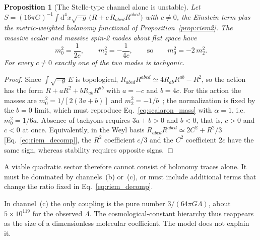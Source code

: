 \documentclass[reprint,aps,prd,amsmath,amssymb,superscriptaddress,nofootinbib,floatfix]{revtex4-2}
\theoremstyle{plain}
\newtheorem{proposition}{Proposition}
\theoremstyle{definition}
\theoremstyle{remark}
\newcommand{\dd}{\mathrm{d}}
\begin{document}
\begin{proposition}[The Stelle-type channel alone is unstable]
\label{prop:stelle}
Let $S=(16\pi G)^{-1}\int\dd^4x\sqrt{-g}\,\big(R+c\,R_{abcd}R^{abcd}\big)$ with $c\neq0$, the Einstein term plus the
metric-weighted holonomy functional of Proposition~\ref{prop:riem2}. The massive scalar and massive spin-2 modes
about flat space have
\begin{equation}
m_0^2=\frac{1}{2c},\qquad m_2^2=-\frac{1}{4c},\qquad\text{so}\qquad m_0^2=-2\,m_2^2 .
\label{eq:stelle_masses}
\end{equation}
For every $c\neq0$ exactly one of the two modes is tachyonic.
\end{proposition}
\begin{proof}
Since $\int\sqrt{-g}\,E$ is topological, $R_{abcd}R^{abcd}\simeq4R_{ab}R^{ab}-R^2$, so the action has the form
$R+aR^2+bR_{ab}R^{ab}$ with $a=-c$ and $b=4c$. For this action the masses are $m_0^2=1/[2(3a+b)]$ and
$m_2^2=-1/b$~\cite{Stelle1978}; the normalization is fixed by the $b=0$ limit, which must reproduce
Eq.~\eqref{eq:scalaron_mass} with $\alpha=1$, i.e.\ $m_0^2=1/6a$. Absence of tachyons requires $3a+b>0$ and
$b<0$, that is, $c>0$ and $c<0$ at once. Equivalently, in the Weyl basis
$R_{abcd}R^{abcd}\simeq2C^2+R^2/3$ [Eq.~\eqref{eq:riem_decomp}], the $R^2$ coefficient $c/3$ and the $C^2$ coefficient
$2c$ have the same sign, whereas stability requires opposite signs.
\end{proof}

A viable quadratic sector therefore cannot consist of holonomy traces alone. It must be dominated by
channels~(b) or~(c), or must include additional terms that change the ratio fixed in Eq.~\eqref{eq:riem_decomp}.

In channel~(c) the only coupling is the pure number $3/(64\pi G\Lambda)$, about $5\times10^{119}$ for the observed
$\Lambda$. The cosmological-constant hierarchy thus reappears as the size of a dimensionless
molecular coefficient. The model does not explain it.
\end{document}
